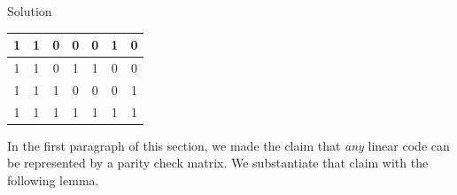 \begin{vworkexampleparsection}{Solution}
\begin{table}
\begin{center}
\begin{tabular}{|c|c|c|c|c|c|c|}
\hline
  1   &  1    &  0    &  0    &  0                           &  1                           &  0                           \\
\hline
  1   &  1    &  0    &  1    &  1                           &  0                           &  0                           \\
\hline
  1   &  1    &  1    &  0    &  0                           &  0                           &  1                           \\
\hline
  1   &  1    &  1    &  1    &  1                           &  1                           &  1                           \\
\hline
\end{tabular}
\end{center}
\end{table}
\end{vworkexampleparsection}
\vworkexamplefooter{}

In the first paragraph of this section, we made the claim that \emph{any} linear
code can be represented by a parity check matrix.  We substantiate that
claim with the following lemma.

